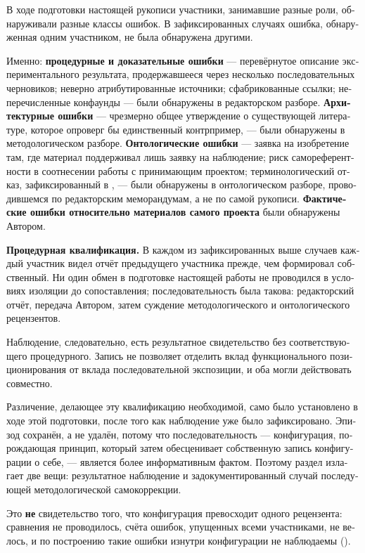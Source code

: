 \begin{russian}
В ходе подготовки настоящей рукописи участники, занимавшие разные роли, обнаруживали разные классы ошибок. В зафиксированных случаях ошибка, обнаруженная одним участником, не была обнаружена другими.

Именно: \textbf{процедурные и доказательные ошибки} — перевёрнутое описание экспериментального результата, продержавшееся через несколько последовательных черновиков; неверно атрибутированные источники; сфабрикованные ссылки; неперечисленные конфаунды — были обнаружены в редакторском разборе. \textbf{Архитектурные ошибки} — чрезмерно общее утверждение о существующей литературе, которое опроверг бы единственный контрпример, — были обнаружены в методологическом разборе. \textbf{Онтологические ошибки} — заявка на изобретение там, где материал поддерживал лишь заявку на наблюдение; риск самореферентности в соотнесении работы с принимающим проектом; терминологический отказ, зафиксированный в , — были обнаружены в онтологическом разборе, проводившемся по редакторским меморандумам, а не по самой рукописи. \textbf{Фактические ошибки относительно материалов самого проекта} были обнаружены Автором.

\textbf{Процедурная квалификация.} В каждом из зафиксированных выше случаев каждый участник видел отчёт предыдущего участника прежде, чем формировал собственный. Ни один обмен в подготовке настоящей работы не проводился в условиях изоляции до сопоставления; последовательность была такова: редакторский отчёт, передача Автором, затем суждение методологического и онтологического рецензентов.

Наблюдение, следовательно, есть результатное свидетельство без соответствующего процедурного. Запись не позволяет отделить вклад функционального позиционирования от вклада последовательной экспозиции, и оба могли действовать совместно.

Различение, делающее эту квалификацию необходимой, само было установлено в ходе этой подготовки, после того как наблюдение уже было зафиксировано. Эпизод сохранён, а не удалён, потому что последовательность — конфигурация, порождающая принцип, который затем обесценивает собственную запись конфигурации о себе, — является более информативным фактом. Поэтому раздел излагает две вещи: результатное наблюдение и задокументированный случай последующей методологической самокоррекции.

Это \textbf{не} свидетельство того, что конфигурация превосходит одного рецензента: сравнения не проводилось, счёта ошибок, упущенных всеми участниками, не велось, и по построению такие ошибки изнутри конфигурации не наблюдаемы ().


\end{russian}
